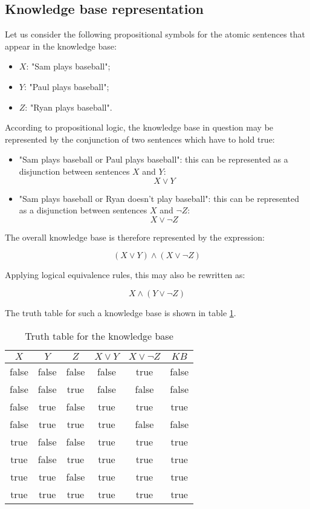 \documentclass[letterpaper,headings=standardclasses]{scrartcl}
\begin{document}
\subsection{Knowledge base representation}

Let us consider the following propositional symbols for the atomic sentences that appear in the knowledge base:

\begin{itemize}
    \item $X$: "Sam plays baseball";
    \item $Y$: "Paul plays baseball";
    \item $Z$: "Ryan plays baseball".
\end{itemize}

According to propositional logic, the knowledge base in question may be represented by the conjunction of two sentences which have to hold true:

\begin{itemize}
    \item "Sam plays baseball or Paul plays baseball": this can be represented as a disjunction between sentences $X$ and $Y$:
    $$ X \vee Y $$
    \item "Sam plays baseball or Ryan doesn't play baseball": this can be represented as a disjunction between sentences $X$ and $\neg Z$:
    $$ X \vee \neg Z $$
\end{itemize}

The overall knowledge base is therefore represented by the expression:

$$ (X \vee Y) \wedge (X \vee \neg Z) $$

Applying logical equivalence rules, this may also be rewritten as:

$$ X \wedge (Y \vee \neg Z) $$

The truth table for such a knowledge base is shown in table \ref{tt_kb}.

\begin{table}[h]
    \centering
    \begin{tabular}{|c|c|c|c|c|c|}
    \hline
    $X$ & $Y$ & $Z$ & $X \vee Y$ & $X \vee \neg Z$ & $KB$ \\ \hline
    false & false & false & false & true & false \\ \hline
    false & false & true & false & false & false \\ \hline
    false & true & false & true & true & true \\ \hline
    false & true & true & true & false & false \\ \hline
    true & false & false & true & true & true \\ \hline
    true & false & true & true & true & true \\ \hline
    true & true & false & true & true & true \\ \hline
    true & true & true & true & true & true \\ \hline
    \end{tabular}
    \caption{Truth table for the knowledge base}
    \label{tt_kb}
\end{table}
\end{document}
